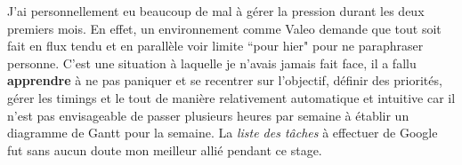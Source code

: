 J'ai personnellement eu beaucoup de mal à gérer la pression durant les deux premiers mois. En effet, un environnement comme Valeo demande que tout soit fait en flux tendu et en parallèle voir limite ``pour hier" pour ne paraphraser personne. C'est une situation à laquelle je n'avais jamais fait face, il a fallu \textbf{apprendre} à ne pas paniquer et se recentrer sur l'objectif, définir des priorités, gérer les timings et le tout de manière relativement automatique et intuitive car il n'est pas envisageable de passer plusieurs heures par semaine à établir un diagramme de Gantt pour la semaine. La \emph{liste des tâches} à effectuer de Google fut sans aucun doute mon meilleur allié pendant ce stage.
